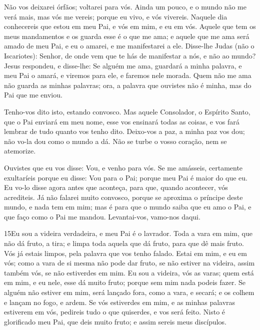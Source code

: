 Não vos deixarei órfãos; voltarei para vós. Ainda um
pouco, e o mundo não me verá mais, mas vós me vereis; porque eu
vivo, e vós vivereis. Naquele dia conhecereis que estou em
meu Pai, e vós em mim, e eu em vós. Aquele que tem os meus
mandamentos e os guarda esse é o que me ama; e aquele que me ama
será amado de meu Pai, e eu o amarei, e me manifestarei a ele.
Disse-lhe Judas (não o Iscariotes): Senhor, de onde vem que
te hás de manifestar a nós, e não ao mundo? Jesus respondeu,
e disse-lhe: Se alguém me ama, guardará a minha palavra, e meu Pai o
amará, e viremos para ele, e faremos nele morada. Quem não me
ama não guarda as minhas palavras; ora, a palavra que ouvistes não é
minha, mas do Pai que me enviou.

Tenho-vos dito isto, estando convosco. Mas aquele
Consolador, o Espírito Santo, que o Pai enviará em meu nome, esse
vos ensinará todas as coisas, e vos fará lembrar de tudo quanto vos
tenho dito. Deixo-vos a paz, a minha paz vos dou; não vo-la
dou como o mundo a dá. Não se turbe o vosso coração, nem se
atemorize.

Ouvistes que eu vos disse: Vou, e venho para vós. Se me amásseis,
certamente exultaríeis porque eu disse: Vou para o Pai; porque meu
Pai é maior do que eu. Eu vo-lo disse agora antes que
aconteça, para que, quando acontecer, vós acrediteis. Já não
falarei muito convosco, porque se aproxima o príncipe deste mundo, e
nada tem em mim; mas é para que o mundo saiba que eu amo o
Pai, e que faço como o Pai me mandou. Levantai-vos, vamo-nos daqui.

\medskip

\lettrine{15} Eu sou a videira verdadeira, e meu Pai é o
lavrador. Toda a vara em mim, que não dá fruto, a tira; e limpa
toda aquela que dá fruto, para que dê mais fruto. Vós já estais
limpos, pela palavra que vos tenho falado. Estai em mim, e eu em
vós; como a vara de si mesma não pode dar fruto, se não estiver na
videira, assim também vós, se não estiverdes em mim. Eu sou a
videira, vós as varas; quem está em mim, e eu nele, esse dá muito
fruto; porque sem mim nada podeis fazer. Se alguém não estiver
em mim, será lançado fora, como a vara, e secará; e os colhem e
lançam no fogo, e ardem. Se vós estiverdes em mim, e as minhas
palavras estiverem em vós, pedireis tudo o que quiserdes, e vos será
feito. Nisto é glorificado meu Pai, que deis muito fruto; e
assim sereis meus discípulos.

